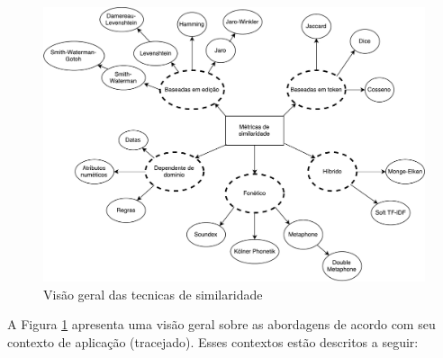 \begin{figure}[!ht]
	\centering
	\includegraphics[width=1\textwidth]{./imagens/similarity-metrics.pdf}
	\caption{Visão geral das tecnicas de similaridade}
	\label{fig:tecnicas_similaridade}
\end{figure}

A Figura \ref{fig:tecnicas_similaridade} apresenta uma visão geral sobre as abordagens de acordo com seu contexto de aplicação (tracejado). Esses contextos estão descritos a seguir:

